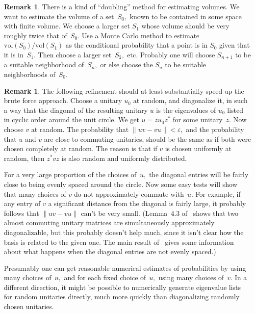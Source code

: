 \documentclass[10pt]{amsart}
\theoremstyle{definition}
\newtheorem{rmk}[thm]{Remark}
\newcommand{\ep}{\varepsilon}
\begin{document}
\begin{rmk}\label{R-Doubling}
There is a kind of ``doubling'' method for estimating volumes.
We want to estimate the volume of a set~$S_0,$
known to be contained in some space with finite volume.
We choose a larger set $S_1$ whose volume should be very roughly twice
that of~$S_0.$
Use a Monte Carlo method
to estimate ${\mathrm{vol}} (S_0) / {\mathrm{vol}} (S_1)$
as the conditional probability that a point is in $S_0$ given
that it is in~$S_1.$
Then choose a larger set~$S_2,$ etc.
Probably
one will choose $S_{n + 1}$ to be a suitable neighborhood of~$S_n,$
or else choose the $S_n$ to be suitable neighborhoods of~$S_0.$
\end{rmk}

\begin{rmk}\label{R-OneDiag}
The following refinement should at least substantially speed up
the brute force approach.
Choose a unitary $u_0$ at random, and diagonalize it,
in such a way that the diagonal of the resulting unitary $u$
is the eigenvalues of $u_0$ listed in cyclic order around
the unit circle.
We get $u = z u_0 z^*$ for some unitary~$z.$
Now choose $v$ at random.
The probability that $\| u v - v u \| < \ep,$
and the probability that $u$ and $v$ are close to commuting unitaries,
should be the same as if both were chosen completely at random.
The reason is that if $v$ is chosen uniformly at random,
then $z^* v z$ is also random and uniformly distributed.

For a very large proportion of the choices of~$u,$
the diagonal entries will be fairly close to being evenly spaced
around the circle.
Now some easy tests will show that many choices of $v$
do not approximately commute with~$u.$
For example,
if any entry of $v$ a significant distance from the diagonal
is fairly large,
it probably follows that $\| u v - v u \|$ can't be very small.
(Lemma~4.3 of~\cite{St} shows that two almost commuting
unitary matrices are simultaneously approximately diagonalizable,
but this probably doesn't help much,
since it isn't clear how the basis is related to the given one.
The main result of~\cite{Os} gives some information
about what happens when the diagonal entries are not evenly spaced.)

Presumably one can get reasonable numerical estimates
of probabilities by using many choices of~$u,$
and for each fixed choice of~$u,$
using many choices of~$v.$
In a different direction,
it might be possible to numerically generate eigenvalue lists
for random unitaries directly,
much more quickly than diagonalizing randomly chosen unitaries.
\end{rmk}
\end{document}

